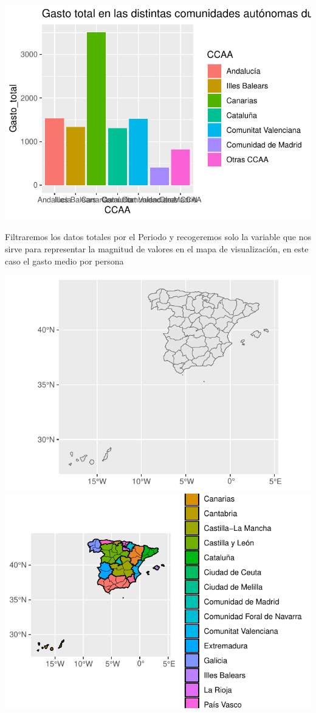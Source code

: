 \documentclass[data,article,submit,moreauthors,pdftex]{Definitions/mdpi}
\begin{document}
\includegraphics{ProyectoAED2024_Rmd_files/figure-latex/unnamed-chunk-28-1}

Filtraremos los datos totales por el Periodo y recogeremos solo la
variable que nos sirve para representar la magnitud de valores en el
mapa de visualización, en este caso el gasto medio por persona

\includegraphics{ProyectoAED2024_Rmd_files/figure-latex/unnamed-chunk-34-1}
\includegraphics{ProyectoAED2024_Rmd_files/figure-latex/unnamed-chunk-34-2}
\end{document}
